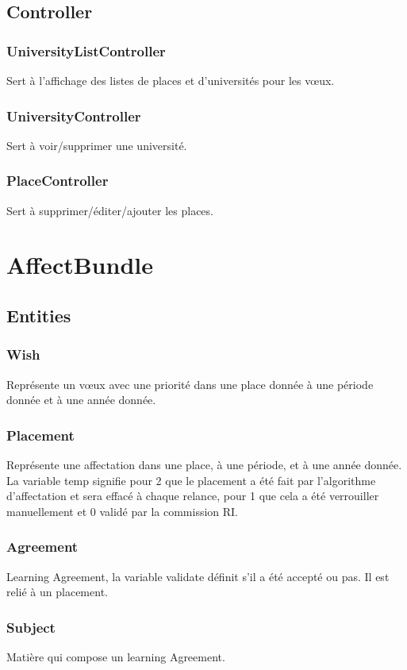 \subsection{Controller}
\subsubsection{UniversityListController}
Sert à l'affichage des listes de places et d'universités pour les vœux.

\subsubsection{UniversityController}
Sert à voir/supprimer une université. 

\subsubsection{PlaceController}
Sert à supprimer/éditer/ajouter les places.


\section{AffectBundle}
\subsection{Entities}
\subsubsection{Wish}
Représente un vœux avec une priorité dans une place donnée à une période donnée et à une année donnée.

\subsubsection{Placement}
Représente une affectation dans une place, à une période, et à une année donnée. La variable temp signifie pour 2 que le placement a été fait par l'algorithme d'affectation et sera effacé à chaque relance, pour 1 que cela a été verrouiller manuellement et 0 validé par la commission RI.

\subsubsection{Agreement}
Learning Agreement, la variable validate définit s'il a été accepté ou pas. Il est relié à un placement.

\subsubsection{Subject}
Matière qui compose un learning Agreement.

